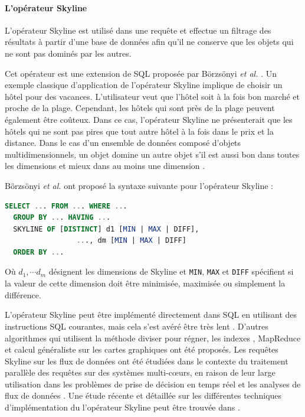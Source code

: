 \paragraph{L'opérateur Skyline}
L'opérateur Skyline est utilisé dans une requête et effectue un filtrage des résultats à partir d'une base de données afin qu'il ne conserve que les objets qui ne sont pas dominés par les autres.

Cet opérateur est une extension de SQL proposée par Börzsönyi \textit{et al.} \cite{Borzsony01}. Un exemple classique d'application de l'opérateur Skyline implique de choisir un hôtel pour des vacances. L'utilisateur veut que l'hôtel soit à la fois bon marché et proche de la plage. Cependant, les hôtels qui sont près de la plage peuvent également être coûteux. Dans ce cas, l'opérateur Skyline ne présenterait que les hôtels qui ne sont pas pires que tout autre hôtel à la fois dans le prix et la distance.
Dans le cas d'un ensemble de données composé d'objets multidimensionnels, un objet domine un autre objet s'il est aussi bon dans toutes les dimensions et mieux dans au moins une dimension \cite{Tiakas15}.

\begin{example}
 Börzsönyi \textit{et al.} ont proposé la syntaxe suivante pour l'opérateur Skyline \cite{Borzsony01} :
 \begin{lstlisting}[language=Sql]
  SELECT ... FROM ... WHERE ...
  GROUP BY ... HAVING ...
  SKYLINE OF [DISTINCT] d1 [MIN | MAX | DIFF],
                 ..., dm [MIN | MAX | DIFF]
  ORDER BY ...
 \end{lstlisting}
 Où $d_1, \cdots d_m$ désignent les dimensions de Skyline et \texttt{MIN}, \texttt{MAX} et \texttt{DIFF} spécifient si la valeur de cette dimension doit être minimisée, maximisée ou simplement la différence.
\end{example}

L'opérateur Skyline peut être implémenté directement dans SQL en utilisant des instructions SQL courantes, mais cela s'est avéré être très lent \cite{Borzsony01}. D'autres algorithmes qui utilisent la méthode diviser pour régner, les indexes \cite{Borzsony01}, MapReduce \cite{Mullesgaard14} et calcul généraliste sur les cartes graphiques \cite{Bogh13} ont été proposés. Les requêtes Skyline sur les flux de données ont été étudiées dans le contexte du traitement parallèle des requêtes sur des systèmes multi-cœurs, en raison de leur large utilisation dans les problèmes de prise de décision en temps réel et les analyses de flux de données \cite{De16}.
Une étude récente et détaillée sur les différentes techniques d'implémentation du l'opérateur Skyline peut être trouvée dans \cite{Tiakas15}.

